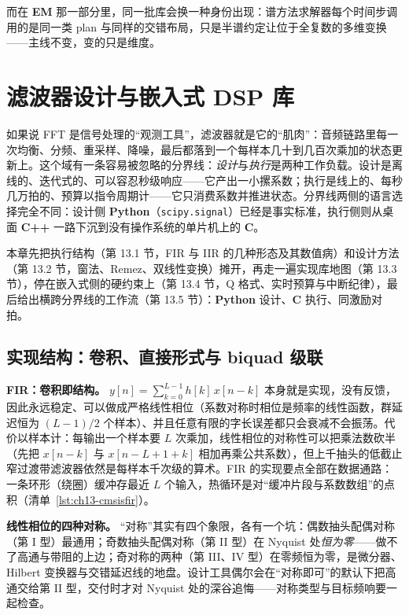 \documentclass[12pt,a4paper,fontset=fandol]{ctexbook}
\newcommand{\Tp}[1]{\texttt{#1}}
\newcommand{\Lang}[1]{\textsf{\bfseries #1}}
\newcommand{\CL}{\Lang{C}}
\newcommand{\CPP}{\Lang{C++}}
\newcommand{\PY}{\Lang{Python}}
\newcommand{\EMW}{\Lang{EM}}
\begin{document}
而在 \EMW{} 那一部分里，同一批库会换一种身份出现：谱方法求解器每个时间步调用的是同一类 plan 与同样的交错布局，只是半谱约定让位于全复数的多维变换——主线不变，变的只是维度。

\chapter{滤波器设计与嵌入式 DSP 库}

如果说 FFT 是信号处理的``观测工具''，滤波器就是它的``肌肉''：音频链路里每一次均衡、分频、重采样、降噪，最后都落到一个每样本几十到几百次乘加的状态更新上。这个域有一条容易被忽略的分界线：\emph{设计}与\emph{执行}是两种工作负载。设计是离线的、迭代式的、可以容忍秒级响应——它产出一小摞系数；执行是线上的、每秒几万拍的、预算以指令周期计——它只消费系数并推进状态。分界线两侧的语言选择完全不同：设计侧 \PY{}（\Tp{scipy.signal}）已经是事实标准，执行侧则从桌面 \CPP{} 一路下沉到没有操作系统的单片机上的 \CL{}。

本章先把执行结构（第 13.1 节，FIR 与 IIR 的几种形态及其数值病）和设计方法（第 13.2 节，窗法、Remez、双线性变换）摊开，再走一遍实现库地图（第 13.3 节），停在嵌入式侧的硬约束上（第 13.4 节，Q 格式、实时预算与中断纪律），最后给出横跨分界线的工作流（第 13.5 节）：\PY{} 设计、\CL{} 执行、同激励对拍。

\section{实现结构：卷积、直接形式与 biquad 级联}

\textbf{FIR：卷积即结构。} $y[n] = \sum_{k=0}^{L-1} h[k]\, x[n-k]$ 本身就是实现，没有反馈，因此永远稳定、可以做成严格线性相位（系数对称时相位是频率的线性函数，群延迟恒为 $(L-1)/2$ 个样本）、并且任意有限的字长误差都只会衰减不会振荡。代价以样本计：每输出一个样本要 $L$ 次乘加，线性相位的对称性可以把乘法数砍半（先把 $x[n-k]$ 与 $x[n-L+1+k]$ 相加再乘公共系数），但上千抽头的低截止窄过渡带滤波器依然是每样本千次级的算术。FIR 的实现要点全部在数据通路：一条环形（绕圈）缓冲存最近 $L$ 个输入，热循环是对``缓冲片段与系数数组''的点积（清单~\ref{lst:ch13-cmsisfir}）。

\textbf{线性相位的四种对称。} ``对称''其实有四个象限，各有一个坑：偶数抽头配偶对称（第 I 型）最通用；奇数抽头配偶对称（第 II 型）在 Nyquist 处\emph{恒为零}——做不了高通与带阻的上边；奇对称的两种（第 III、IV 型）在零频恒为零，是微分器、Hilbert 变换器与交错延迟线的地盘。设计工具偶尔会在``对称即可''的默认下把高通交给第 II 型，交付时才对 Nyquist 处的深谷追悔——对称类型与目标频响要一起检查。
\end{document}
